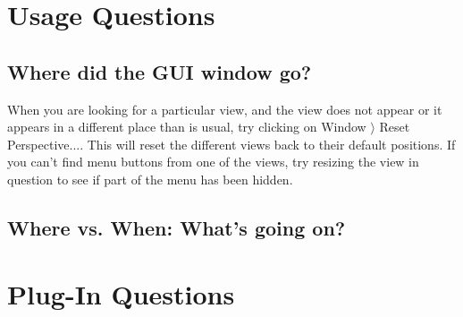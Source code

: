 \section{Usage Questions}

\subsection{Where did the GUI window go?}

When you are looking for a particular view, and the view does not appear or it appears in a different place than is usual, try clicking on \textsf{Window $\rangle $ Reset Perspective...}. This will reset the different views back to their default positions. If you can't find menu buttons from one of the views, try resizing the view in question to see if part of the menu has been hidden.

\subsection{Where vs. When: What's going on?}

\section{Plug-In Questions}

